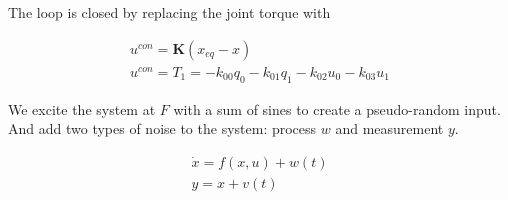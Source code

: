 \documentclass{article}
\begin{document}

The loop is closed by replacing the joint torque with

\begin{align}
   u^{con} = \mathbf{K} (x_{eq} - x) \\
   u^{con} = T_{1} = -k_{00} q_0 - k_{01} q_1 - k_{02} u_0 - k_{03} u_1
\end{align}

We excite the system at $F$ with a sum of sines to create a pseudo-random
input. And add two types of noise to the system: process $w$ and measurement
$y$.

\begin{align}
  \dot{x} = f(x, u) + w(t) \\
  y = x + v(t)
\end{align}
\end{document}
